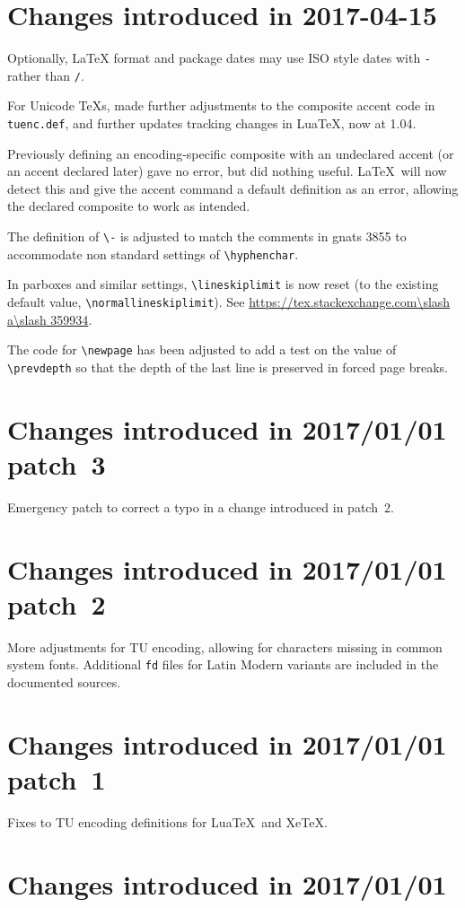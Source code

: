 \documentclass{ltxguide}
\newcommand\gnatsissue[1]{gnats #1}
\newcommand\sxanswer[1]{\url{https://tex.stackexchange.com\slash a\slash #1}}
\newcommand\gnatsissue[1]{%
    \href{https://www.latex-project.org/cgi-bin/ltxbugs2html?pr=latex/#1}{gnats #1}}
\newcommand\sxanswer[1]{%
     \url{https://tex.stackexchange.com/a/#1}}
\begin{document}
\section{Changes  introduced in 2017-04-15}
Optionally, \LaTeX{} format and package dates may use ISO style dates with
\texttt{-}  rather than \texttt{/}.

For Unicode \TeX{}s, made further adjustments to the composite accent
code in \texttt{tuenc.def}, and further updates tracking changes in
Lua\TeX, now at 1.04.

Previously defining an encoding-specific composite with an undeclared
accent (or an accent declared later) gave no error, but did nothing useful.
\LaTeX\ will now detect this and give the accent command a default definition
as an error, allowing the declared composite to work as intended.

The definition of \verb|\-| is adjusted to match the comments in
\gnatsissue{3855} to accommodate non standard settings of \verb|\hyphenchar|.

In parboxes and similar settings, \verb|\lineskiplimit| is now
reset (to the existing default value, \verb|\normallineskiplimit|).
See \sxanswer{359934}.

 The code for \verb|\newpage| has been adjusted to add a test on the value of
\verb|\prevdepth| so that the depth of the last line is preserved in
forced page breaks.

\section{Changes  introduced in 2017/01/01 patch~3}
Emergency patch to correct a typo in a change introduced in patch~2.

\section{Changes  introduced in 2017/01/01 patch~2}
More adjustments for TU encoding, allowing for characters missing in
common system fonts. Additional \texttt{fd} files
for Latin Modern variants are included in the documented sources.

\section{Changes  introduced in 2017/01/01 patch~1}
Fixes to TU encoding definitions for Lua\TeX\ and Xe\TeX.

\section{Changes  introduced in 2017/01/01}
\end{document}
